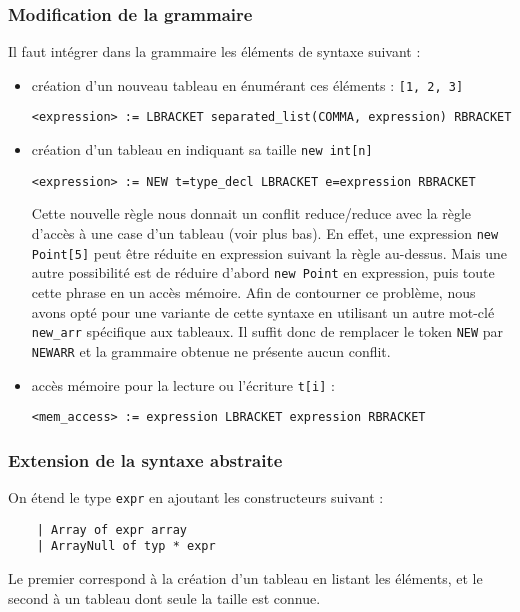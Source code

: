 \documentclass{article}
\begin{document}
\subsubsection{Modification de la grammaire}
Il faut intégrer dans la grammaire les éléments de syntaxe suivant : 
\begin{itemize}
    \item création d'un nouveau tableau en énumérant ces éléments : \texttt{[1, 2, 3]}
            \begin{lstlisting}[style=mystyle]
<expression> := LBRACKET separated_list(COMMA, expression) RBRACKET\end{lstlisting}
    \item création d'un tableau en indiquant sa taille \texttt{new int[n]}
    \begin{lstlisting}[style=mystyle]
<expression> := NEW t=type_decl LBRACKET e=expression RBRACKET\end{lstlisting}
        Cette nouvelle règle nous donnait un conflit reduce/reduce avec la règle d'accès à une case d'un tableau (voir plus bas).
        En effet, une expression \texttt{new Point[5]} peut être réduite en expression suivant la règle au-dessus.
        Mais une autre possibilité est de réduire d'abord \texttt{new Point} en expression, puis toute 
        cette phrase en un accès mémoire.
        Afin de contourner ce problème, nous avons opté pour une variante de cette syntaxe 
        en utilisant un autre mot-clé \texttt{new\_arr} spécifique aux tableaux.
        Il suffit donc de remplacer le token \texttt{NEW} par \texttt{NEWARR} et la grammaire 
        obtenue ne présente aucun conflit.
    \item accès mémoire pour la lecture ou l'écriture \texttt{t[i]} : 
    \begin{lstlisting}[style=mystyle]
<mem_access> := expression LBRACKET expression RBRACKET\end{lstlisting}
    \end{itemize}

\subsubsection{Extension de la syntaxe abstraite}
On étend le type \texttt{expr} en ajoutant les constructeurs suivant : 
\begin{verbatim}
    | Array of expr array
    | ArrayNull of typ * expr
\end{verbatim}

Le premier correspond à la création d'un tableau en listant les éléments, et le second 
à un tableau dont seule la taille est connue.
\end{document}
